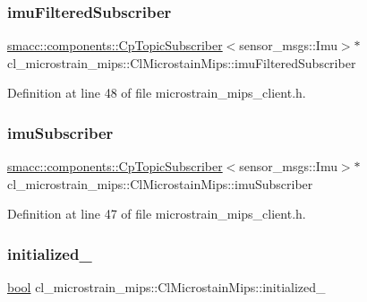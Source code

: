 \subsubsection{\texorpdfstring{imu\+Filtered\+Subscriber}{imuFilteredSubscriber}}
{\footnotesize\ttfamily \hyperlink{classsmacc_1_1components_1_1CpTopicSubscriber}{smacc\+::components\+::\+Cp\+Topic\+Subscriber}$<$sensor\+\_\+msgs\+::\+Imu$>$$\ast$ cl\+\_\+microstrain\+\_\+mips\+::\+Cl\+Microstain\+Mips\+::imu\+Filtered\+Subscriber}



Definition at line 48 of file microstrain\+\_\+mips\+\_\+client.\+h.

\mbox{\label{classcl__microstrain__mips_1_1ClMicrostainMips_a71648a9d970672d017c90bd3724b1104}} 
\subsubsection{\texorpdfstring{imu\+Subscriber}{imuSubscriber}}
{\footnotesize\ttfamily \hyperlink{classsmacc_1_1components_1_1CpTopicSubscriber}{smacc\+::components\+::\+Cp\+Topic\+Subscriber}$<$sensor\+\_\+msgs\+::\+Imu$>$$\ast$ cl\+\_\+microstrain\+\_\+mips\+::\+Cl\+Microstain\+Mips\+::imu\+Subscriber}



Definition at line 47 of file microstrain\+\_\+mips\+\_\+client.\+h.

\mbox{\label{classcl__microstrain__mips_1_1ClMicrostainMips_ac57a43d359bfadaf897b51a57ccb3dc8}} 
\subsubsection{\texorpdfstring{initialized\+\_\+}{initialized\_}}
{\footnotesize\ttfamily \hyperlink{classbool}{bool} cl\+\_\+microstrain\+\_\+mips\+::\+Cl\+Microstain\+Mips\+::initialized\+\_\+\hspace{0.3cm}{\ttfamily [protected]}}



